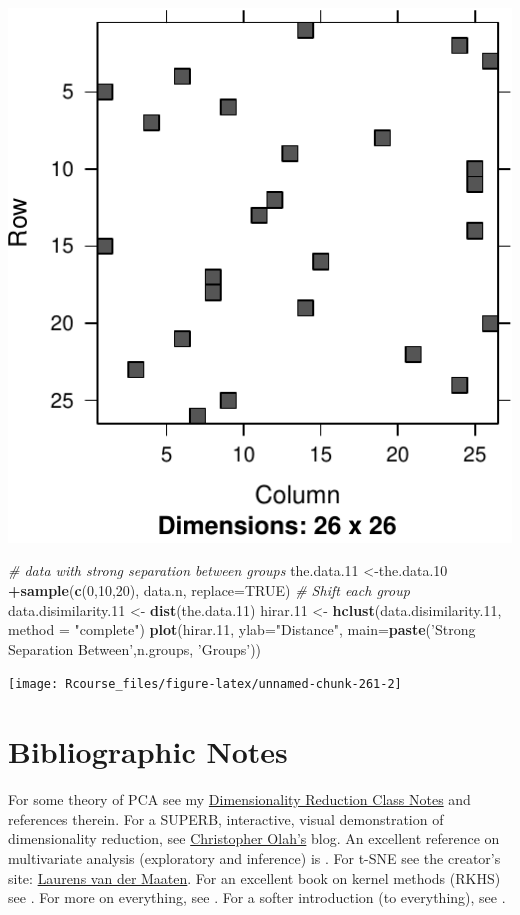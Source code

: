 \documentclass[]{book}
\newenvironment{Shaded}{\begin{snugshade}}{\end{snugshade}}
\newcommand{\KeywordTok}[1]{\textcolor[rgb]{0.13,0.29,0.53}{\textbf{#1}}}
\newcommand{\DataTypeTok}[1]{\textcolor[rgb]{0.13,0.29,0.53}{#1}}
\newcommand{\DecValTok}[1]{\textcolor[rgb]{0.00,0.00,0.81}{#1}}
\newcommand{\StringTok}[1]{\textcolor[rgb]{0.31,0.60,0.02}{#1}}
\newcommand{\CommentTok}[1]{\textcolor[rgb]{0.56,0.35,0.01}{\textit{#1}}}
\newcommand{\OtherTok}[1]{\textcolor[rgb]{0.56,0.35,0.01}{#1}}
\newcommand{\OperatorTok}[1]{\textcolor[rgb]{0.81,0.36,0.00}{\textbf{#1}}}
\newcommand{\NormalTok}[1]{#1}
\theoremstyle{definition}
\theoremstyle{definition}
\theoremstyle{definition}
\theoremstyle{remark}
\begin{document}
\includegraphics[width=0.5\linewidth]{Rcourse_files/figure-latex/unnamed-chunk-261-1}

\begin{Shaded}
\begin{Highlighting}[]
\CommentTok{# data with strong separation between groups}
\NormalTok{the.data.}\DecValTok{11}\NormalTok{ <-the.data.}\DecValTok{10} \OperatorTok{+}\KeywordTok{sample}\NormalTok{(}\KeywordTok{c}\NormalTok{(}\DecValTok{0}\NormalTok{,}\DecValTok{10}\NormalTok{,}\DecValTok{20}\NormalTok{), data.n, }\DataTypeTok{replace=}\OtherTok{TRUE}\NormalTok{) }\CommentTok{# Shift each group }
\NormalTok{data.disimilarity.}\DecValTok{11}\NormalTok{ <-}\StringTok{ }\KeywordTok{dist}\NormalTok{(the.data.}\DecValTok{11}\NormalTok{)}
\NormalTok{hirar.}\DecValTok{11}\NormalTok{ <-}\StringTok{ }\KeywordTok{hclust}\NormalTok{(data.disimilarity.}\DecValTok{11}\NormalTok{, }\DataTypeTok{method =} \StringTok{"complete"}\NormalTok{)}
\KeywordTok{plot}\NormalTok{(hirar.}\DecValTok{11}\NormalTok{, }\DataTypeTok{ylab=}\StringTok{"Distance"}\NormalTok{, }\DataTypeTok{main=}\KeywordTok{paste}\NormalTok{(}\StringTok{'Strong Separation Between'}\NormalTok{,n.groups, }\StringTok{'Groups'}\NormalTok{))}
\end{Highlighting}
\end{Shaded}

\texttt{[image: Rcourse\_files/figure-latex/unnamed-chunk-261-2]}

\section{Bibliographic Notes}\label{bibliographic-notes-8}

For some theory of PCA see my
\href{https://github.com/johnros/dim_reduce/blob/master/dim_reduce.pdf}{Dimensionality
Reduction Class Notes} and references therein. For a SUPERB,
interactive, visual demonstration of dimensionality reduction, see
\href{http://colah.github.io/posts/2014-10-Visualizing-MNIST/}{Christopher
Olah's} blog. An excellent reference on multivariate analysis
(exploratory and inference) is \citet{izenman2008modern}. For t-SNE see
the creator's site: \href{https://lvdmaaten.github.io/tsne/}{Laurens van
der Maaten}. For an excellent book on kernel methods (RKHS) see
\citet{shawe2004kernel}. For more on everything, see
\citet{friedman2001elements}. For a softer introduction (to everything),
see \citet{james2013introduction}.
\end{document}
